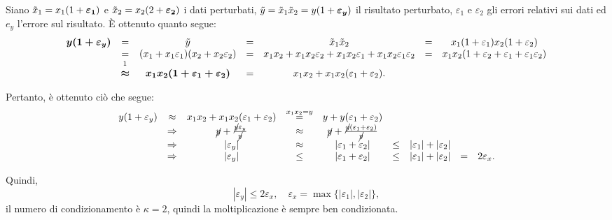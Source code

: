 Siano $\Tilde{x}_1=x_1(1+\boldsymbol{\varepsilon_1})$ e $\Tilde{x}_2=x_2(2+\boldsymbol{\varepsilon_2})$ i dati perturbati, $\Tilde{y}=\Tilde{x}_1\Tilde{x}_2=y(1+\boldsymbol{\varepsilon_y})$ il risultato perturbato, $\varepsilon_1$ e $\varepsilon_2$ gli errori relativi sui dati ed $e_y$ l'errore sul risultato. È ottenuto quanto segue:
\begin{equation*}
    \begin{matrix}
        \boldsymbol{y(1+\varepsilon_y)}&=&\Tilde{y}&=&\Tilde{x}_1\Tilde{x}_2&=&x_1(1+\varepsilon_1)x_2(1+\varepsilon_2)\\
        &=&(x_1+x_1\varepsilon_1)(x_2+x_2\varepsilon_2) &=&x_1x_2+x_1x_2\varepsilon_2+x_1x_2\varepsilon_1+x_1x_2\varepsilon_1\varepsilon_2&=&x_1x_2(1+\varepsilon_2+\varepsilon_1+\varepsilon_1\varepsilon_2)\\
        &\overset{\footnotemark}{\boldsymbol{\approx}}&\boldsymbol{x_1x_2(1+\varepsilon_1+\varepsilon_2)}&=&x_1x_2+x_1x_2(\varepsilon_1+\varepsilon_2).
    \end{matrix}
\end{equation*}


Pertanto, è ottenuto ciò che segue:
\begin{equation*}
    \begin{matrix}
        y(1+\varepsilon_y) &\approx& x_1x_2+x_1x_2(\varepsilon_1+\varepsilon_2) &\overset{x_1x_2=y}{=}& y+y(\varepsilon_1+\varepsilon_2)\\
        &\Rightarrow&\cancel{y}+\frac{\cancel{y}\varepsilon_y}{\cancel{y}}&\approx&\cancel{y}+\frac{\cancel{y}(\varepsilon_1+\varepsilon_2)}{\cancel{y}}\\
        &\Rightarrow& |\varepsilon_y| &\approx& |\varepsilon_1+\varepsilon_2| &\leq& |\varepsilon_1|+|\varepsilon_2|\\
        &\Rightarrow& |\varepsilon_y| &\leq& |\varepsilon_1 + \varepsilon_2| &\leq& |\varepsilon_1|+|\varepsilon_2| &=& 2\varepsilon_x.
    \end{matrix}
\end{equation*}

Quindi,
\begin{equation*}
    |\varepsilon_y|\leq 2\varepsilon_x,\quad \varepsilon_x=\max\{|\varepsilon_1|,|\varepsilon_2|\},
\end{equation*}
il numero di condizionamento è $\kappa=2$, quindi la moltiplicazione è sempre ben condizionata.

